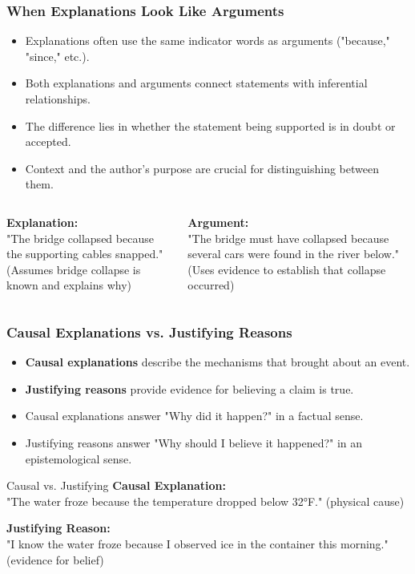 \documentclass{beamer}
\begin{document}
\begin{frame}
    \frametitle{When Explanations Look Like Arguments}
    \begin{itemize}
        \item Explanations often use the same indicator words as arguments ("because," "since," etc.).
        \item Both explanations and arguments connect statements with inferential relationships.
        \item The difference lies in whether the statement being supported is in doubt or accepted.
        \item Context and the author's purpose are crucial for distinguishing between them.
    \end{itemize}
    
    \begin{columns}[t]
        \textbf{Explanation:}\\
        "The bridge collapsed because the supporting cables snapped."\\
        (Assumes bridge collapse is known and explains why)
        
        \textbf{Argument:}\\
        "The bridge must have collapsed because several cars were found in the river below."\\
        (Uses evidence to establish that collapse occurred)
    \end{columns}
\end{frame}

\begin{frame}
    \frametitle{Causal Explanations vs. Justifying Reasons}
    \begin{itemize}
        \item \textbf{Causal explanations} describe the mechanisms that brought about an event.
        \item \textbf{Justifying reasons} provide evidence for believing a claim is true.
        \item Causal explanations answer "Why did it happen?" in a factual sense.
        \item Justifying reasons answer "Why should I believe it happened?" in an epistemological sense.
    \end{itemize}
    
    \begin{exampleblock}{Causal vs. Justifying}
        \textbf{Causal Explanation:}\\
        "The water froze because the temperature dropped below 32°F." (physical cause)
        
        \textbf{Justifying Reason:}\\
        "I know the water froze because I observed ice in the container this morning." (evidence for belief)
    \end{exampleblock}
\end{frame}
\end{document}
